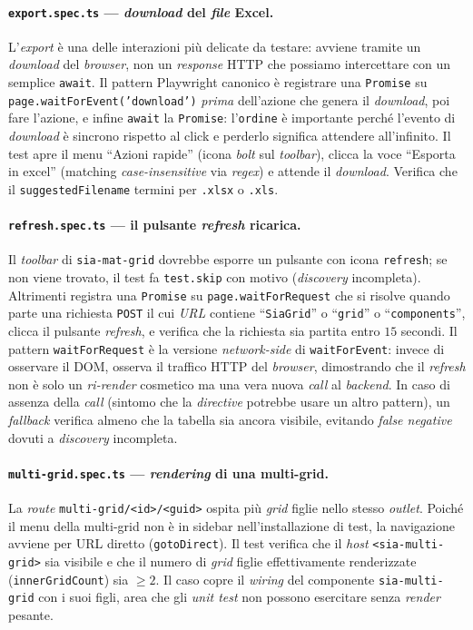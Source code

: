 \paragraph{\texttt{export.spec.ts} — \emph{download} del \emph{file} Excel.} L'\emph{export} è una delle interazioni più delicate da testare: avviene tramite un \emph{download} del \emph{browser}, non un \emph{response} HTTP che possiamo intercettare con un semplice \texttt{await}. Il pattern Playwright canonico è registrare una \texttt{Promise} su \texttt{page.waitForEvent('download')} \emph{prima} dell'azione che genera il \emph{download}, poi fare l'azione, e infine \texttt{await} la \texttt{Promise}: l'\texttt{ordine} è importante perché l'evento di \emph{download} è sincrono rispetto al click e perderlo significa attendere all'infinito. Il test apre il menu ``Azioni rapide'' (icona \emph{bolt} sul \emph{toolbar}), clicca la voce ``Esporta in excel'' (matching \emph{case-insensitive} via \emph{regex}) e attende il \emph{download}. Verifica che il \texttt{suggestedFilename} termini per \texttt{.xlsx} o \texttt{.xls}.

\paragraph{\texttt{refresh.spec.ts} — il pulsante \emph{refresh} ricarica.} Il \emph{toolbar} di \texttt{sia-mat-grid} dovrebbe esporre un pulsante con icona \texttt{refresh}; se non viene trovato, il test fa \texttt{test.skip} con motivo (\emph{discovery} incompleta). Altrimenti registra una \texttt{Promise} su \texttt{page.waitForRequest} che si risolve quando parte una richiesta \texttt{POST} il cui \emph{URL} contiene ``\texttt{SiaGrid}'' o ``\texttt{grid}'' o ``\texttt{components}'', clicca il pulsante \emph{refresh}, e verifica che la richiesta sia partita entro $15$ secondi. Il pattern \texttt{waitForRequest} è la versione \emph{network-side} di \texttt{waitForEvent}: invece di osservare il DOM, osserva il traffico HTTP del \emph{browser}, dimostrando che il \emph{refresh} non è solo un \emph{ri-render} cosmetico ma una vera nuova \emph{call} al \emph{backend}. In caso di assenza della \emph{call} (sintomo che la \emph{directive} potrebbe usare un altro pattern), un \emph{fallback} verifica almeno che la tabella sia ancora visibile, evitando \emph{false negative} dovuti a \emph{discovery} incompleta.

\paragraph{\texttt{multi-grid.spec.ts} — \emph{rendering} di una multi-grid.} La \emph{route} \texttt{multi-grid/<id>/<guid>} ospita più \emph{grid} figlie nello stesso \emph{outlet}. Poiché il menu della multi-grid non è in sidebar nell'installazione di test, la navigazione avviene per URL diretto (\texttt{gotoDirect}). Il test verifica che il \emph{host} \texttt{<sia-multi-grid>} sia visibile e che il numero di \emph{grid} figlie effettivamente renderizzate (\texttt{innerGridCount}) sia $\geq 2$. Il caso copre il \emph{wiring} del componente \texttt{sia-multi-grid} con i suoi figli, area che gli \emph{unit test} non possono esercitare senza \emph{render} pesante.

